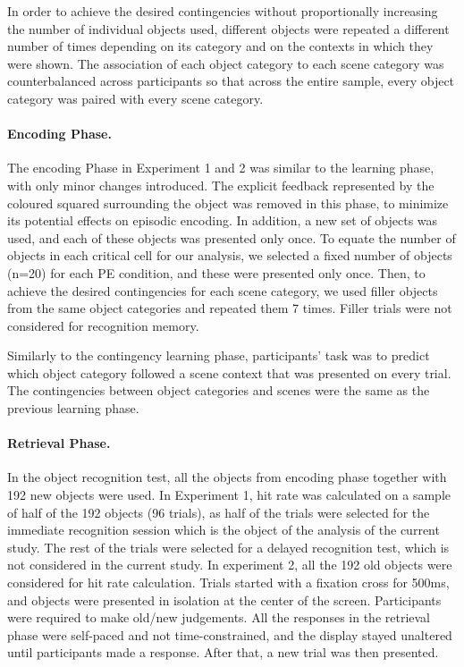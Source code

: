 \documentclass[a4paper,12pt]{article}
\begin{document}
In order to achieve the desired contingencies without proportionally increasing the number of individual objects used, different objects were repeated a different number of times depending on its category and on the contexts in which they were shown. The association of each object category to each scene category was counterbalanced across participants so that across the entire sample, every object category was paired with every scene category.
\paragraph{Encoding Phase.}
The encoding Phase in Experiment 1 and 2 was similar to the learning phase, with only minor changes introduced. The explicit feedback represented by the coloured squared surrounding the object was removed in this phase, to minimize its potential effects on episodic encoding. In addition, a new set of objects was used, and each of these objects was presented only once. To equate the number of objects in each critical cell for our analysis, we selected a fixed number of objects (n=20) for each PE condition, and these were presented only once. Then, to achieve the desired contingencies for each scene category, we used filler objects from the same object categories and repeated them 7 times. Filler trials were not considered for recognition memory. \par
Similarly to the contingency learning phase, participants' task was to predict which object category followed a scene context that was presented on every trial. The contingencies between object categories and scenes were the same as the previous learning phase. 
\paragraph{Retrieval Phase.}
In the object recognition test, all the objects from encoding phase together with 192 new objects were used. 
In Experiment 1, hit rate was calculated on a sample of half of the 192 objects (96 trials), as half of the trials were selected for the immediate recognition session which is the object of the analysis of the current study. The rest of the trials were selected for a delayed recognition test, which is not considered in the current study. In experiment 2, all the 192 old objects were considered for hit rate calculation. Trials started with a fixation cross for 500ms, and objects were presented in isolation at the center of the screen. Participants were required to make old/new judgements. All the responses in the retrieval phase were self-paced and not time-constrained, and the display stayed unaltered until participants made a response. After that, a new trial was then presented.
\end{document}
